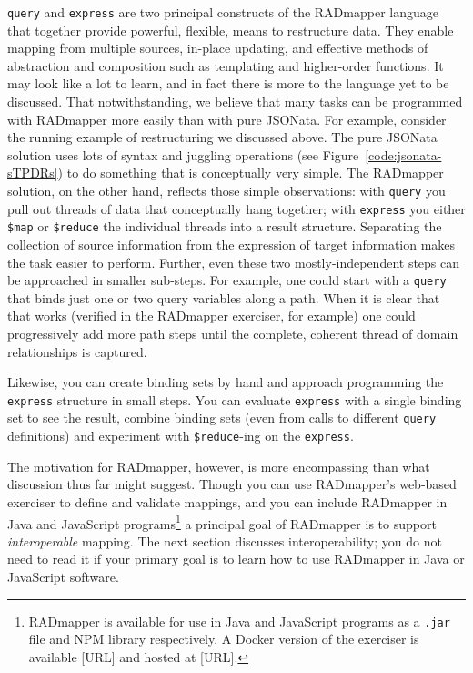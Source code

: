 \documentclass[10pt,letterpaper]{article} %
\newcommand{\stt}[1]{\texttt{#1}} %
\begin{document}
\stt{query} and \stt{express} are two principal constructs of the RADmapper language that together provide powerful, flexible, means to restructure data.
They enable mapping from multiple sources, in-place updating, and effective methods of abstraction and composition such as templating and higher-order functions.
It may look like a lot to learn, and in fact there is more to the language yet to be discussed.
That notwithstanding, we believe that many tasks can be programmed with RADmapper more easily than with pure JSONata.
For example, consider  the running example of restructuring we discussed above.
The pure JSONata solution uses lots of syntax and juggling operations (see Figure~\ref{code:jsonata-sTPDRs}) to do something that is conceptually very simple.
The RADmapper solution, on the other hand, reflects those simple observations: with \stt{query} you pull out threads of data that conceptually hang together;
with \stt{express} you either \stt{\$map} or \stt{\$reduce} the individual threads into a result structure.
Separating the collection of source information from the expression of target information makes the task easier to perform.
Further, even these two mostly-independent steps can be approached in smaller sub-steps.
For example, one could start with a \stt{query} that binds just one or two query variables along a path.
When it is clear that that works (verified in the RADmapper exerciser, for example) one could progressively add more path steps until the complete, coherent thread of domain relationships is captured.

Likewise, you can create binding sets by hand and approach programming the \stt{express} structure in small steps.
You can evaluate \stt{express} with a single binding set to see the result, combine binding sets (even from calls to different \stt{query} definitions) and experiment with \stt{\$reduce}-ing on the \stt{express}.

The motivation for RADmapper, however, is more encompassing than what discussion thus far might suggest.
Though you can use RADmapper's web-based exerciser to define and validate mappings,
and you can include RADmapper in Java and JavaScript programs\footnote{RADmapper is available for use in Java and JavaScript programs as a \stt{.jar} file and NPM library respectively. A Docker version of the exerciser is available [URL] and hosted at [URL].} a principal goal of RADmapper is to support \textit{interoperable} mapping. The next section discusses interoperability; you do not need to read it if your primary goal is to learn how to use RADmapper in Java or JavaScript software.
\end{document}
